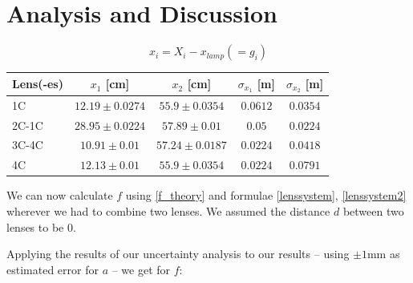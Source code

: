 \documentclass{scrreprt}
\begin{document}
\section{Analysis and Discussion}

\begin{equation}
x_i = X_i - x_{lamp} (= g_i)
\end{equation}
\begin{table}[H]
\center
\begin{tabular}{|l|c|c|c|c|}
\hline
Lens(-es) & $x_1$ [cm] & $x_2$ [cm] & $\sigma_{x_1}$ [m] & $\sigma_{x_2}$ [m]\\
\hline
1C &$12.19 \pm 0.0274$&$55.9 \pm 0.0354$& $0.0612$ & $0.0354$\\
2C-1C &$28.95 \pm 0.0224$&$57.89 \pm 0.01$&$0.05$&$0.0224$\\
3C-4C &$10.91 \pm 0.01$&$57.24 \pm 0.0187$&$0.0224$&$0.0418$\\
4C &$12.13 \pm 0.01$&$55.9 \pm 0.0354$&$0.0224$&$0.0791$\\
\hline
\end{tabular}
\end{table}
We can now calculate $f$ using \ref{f_theory} and formulae \ref{lenssystem},  \ref{lenssystem2} wherever we had to combine two lenses. We assumed the distance $d$ between two lenses to be $0$.

Applying the results of our uncertainty analysis to our results -- using $\pm 1$mm as estimated error for $a$ -- we get for $f$:
\end{document}
